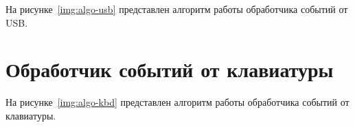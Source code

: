 На рисунке~\ref{img:algo-usb} представлен алгоритм работы обработчика событий от USB.



\section{Обработчик событий от клавиатуры}

На рисунке~\ref{img:algo-kbd} представлен алгоритм работы обработчика событий от клавиатуры.

